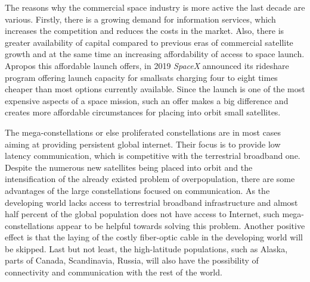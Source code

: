 The reasons why the commercial space industry is more active the last decade are various. Firstly, there is a growing demand for information services, which increases the competition and reduces the costs in the market. Also, there is greater availability of capital compared to previous eras of commercial satellite growth and at the same time an increasing affordability of access to space launch. \cite{Hallex} Apropos this affordable launch offers, in 2019 \textit{SpaceX} announced its rideshare program offering launch capacity for smallsats charging four to eight times cheaper than most options currently available. Since the launch is one of the most expensive aspects of a space mission, such an offer makes a big difference and creates more affordable circumstances for placing into orbit small satellites. \cite{Erwin}

The mega-constellations or else proliferated constellations are in most cases aiming at providing persistent global internet. Their focus is to provide low latency communication, which is competitive with the terrestrial broadband one. Despite the numerous new satellites being placed into orbit and the intensification of the already existed problem of overpopulation, there are some advantages of the large constellations focused on communication. As the developing world lacks access to terrestrial broadband infrastructure and almost half percent of the global population does not have access to Internet, such mega-constellations appear to be helpful towards solving this problem. Another positive effect is that the laying of the costly fiber-optic cable in the developing world will be skipped. Last but not least, the high-latitude populations, such as Alaska, parts of Canada, Scandinavia, Russia, will also have the possibility of connectivity and communication with the rest of the world. \cite{Hallex}

